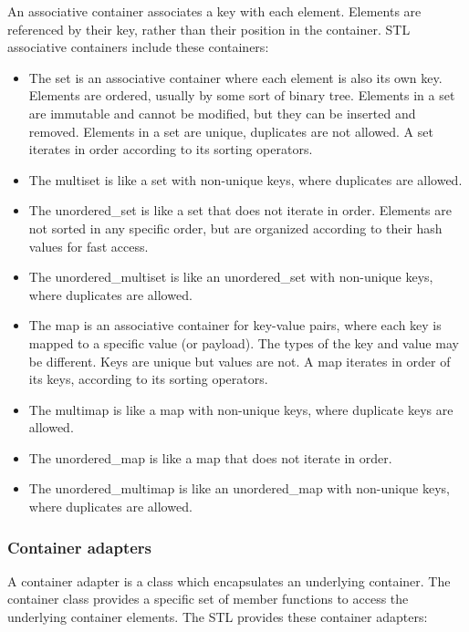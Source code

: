 An associative container associates a key with each element. Elements are referenced by their key, rather than their position in the container. STL associative containers include these containers:

\begin{itemize}
\item 
The set is an associative container where each element is also its own key. Elements are ordered, usually by some sort of binary tree. Elements in a set are immutable and cannot be modified, but they can be inserted and removed. Elements in a set are unique, duplicates are not allowed. A set iterates in order according to its sorting operators.

\item 
The multiset is like a set with non-unique keys, where duplicates are allowed.

\item 
The unordered\_set is like a set that does not iterate in order. Elements are not sorted in any specific order, but are organized according to their hash values for fast access.

\item 
The unordered\_multiset is like an unordered\_set with non-unique keys, where duplicates are allowed.

\item 
The map is an associative container for key-value pairs, where each key is mapped to a specific value (or payload). The types of the key and value may be different. Keys are unique but values are not. A map iterates in order of its keys, according to its sorting operators.

\item 
The multimap is like a map with non-unique keys, where duplicate keys are allowed.

\item 
The unordered\_map is like a map that does not iterate in order.

\item 
The unordered\_multimap is like an unordered\_map with non-unique keys, where duplicates are allowed.
\end{itemize}

\subsubsection{Container adapters}

A container adapter is a class which encapsulates an underlying container. The container class provides a specific set of member functions to access the underlying container elements. The STL provides these container adapters:

